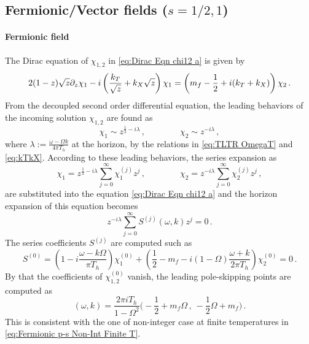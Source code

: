 \documentclass[11pt,a4paper]{article}
\begin{document}
\subsection{Fermionic/Vector fields ($s=1/2, 1$)}\label{subsec:Fermionic/Vector fields}
\paragraph{Fermionic field}
The Dirac equation of $\chi_{1,2}$ in \eqref{eq:Dirac Eqn chi12 a} is given by
\begin{subequations} \notag
\begin{align}
    2(1-z)\sqrt{z}\partial_z \chi_1 - i\left( \frac{k_T}{\sqrt{z}} + k_X \sqrt{z} \right) \chi_1 = \left( m_f-\frac{1}{2}+i(k_T+k_X) \right)\chi_2\,.
\end{align}
\end{subequations}
From the decoupled second order differential equation, the leading behaviors of the incoming solution $\chi_{1,2}$ are found as
\begin{equation}
    \chi_1 \sim z^{\frac{1}{2}-i \lambda}\,, \qquad\qquad \chi_2 \sim z^{-i \lambda}\,, 
\end{equation}
where $\lambda := \frac{\omega - \Omega k}{4 \pi T_h}$ at the horizon, by the relations in \eqref{eq:TLTR OmegaT} and \eqref{eq:kTkX}. According to these leading behaviors, the series expansion as
\begin{equation}
    \chi_1 = z^{\frac{1}{2}-i \lambda} \sum^{\infty}_{j=0}\chi_1^{(j)} z^j\,, \qquad \qquad \chi_2 = z^{-i \lambda} \sum^{\infty}_{j=0}\chi_2^{(j)} z^j\,, 
\end{equation}
are substituted into the equation \eqref{eq:Dirac Eqn chi12 a} and the horizon expansion of this equation becomes
\begin{equation} \label{eq:Fermion horizon series equation}
    z^{-i \lambda} \sum^{
    \infty}_{j=0} S^{(j)}(\omega, k)z^j =0\,.
\end{equation}
The series coefficients $S^{(j)}$ are computed such as 
\begin{equation}
    S^{(0)}=
    \left( 1-i\frac{\omega - k \Omega}{\pi T_h} \right)\chi_1^{(0)}
    +\left(\frac{1}{2}-m_f -i (1-\Omega) \frac{\omega+k}{2\pi T_h} \right)\chi_2^{(0)}
    =0\,.
\end{equation}
By that the coefficients of $\chi_{1,2}^{(0)}$ vanish, the leading pole-skipping points are computed as
\begin{equation}
    (\omega, k)=\frac{2\pi i T_h}{1-\Omega^2}\bigg( -\frac{1}{2} + m_f \Omega\,,~ -\frac{1}{2}\Omega + m_f \bigg)\,.
\end{equation}
This is consistent with the one of non-integer case at finite temperatures in \eqref{eq:Fermionic p-s Non-Int Finite T}.
\end{document}
